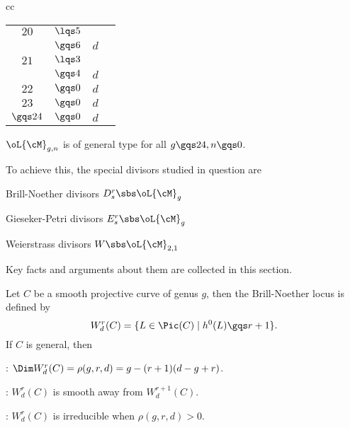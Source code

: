 \documentclass[article, a4paper, twoside]{universal}
\begin{document}
\begin{table}[H]
\begin{tabular}{cc}
\begin{tabular}[t]{cccc}
		  	\hline
			$20$& $\lqs5$ & \red{NK} & \\
				& $\gqs6$ & $d$ & \cite{Farkas2009} \\
		  	\hline
		  	$21$& $\lqs3$ & \red{NK} & \\
				& $\gqs4$ & $d$ & \cite{Farkas2009} \\
		  	\hline
			$22$& $\gqs0$ & $d$ & \cite{FJP2020} \\
		  	$23$& $\gqs0$ & $d$ & \cite{FJP2020} \\
		  	\hline
		  	$\gqs24$& $\gqs0$ & $d$ & \cite{EH1987Kodaira} \\
		  	\bottomrule
		\end{tabular}
	\end{tabular}
\end{table}



\begin{thm}
	$\oL{\cM}_{g,n}$ is of general type for all $g\gqs24,n\gqs0$.
\end{thm}

\begin{rmk}
	To achieve this, the special divisors studied in question are
	\begin{enr}
		\item Brill-Noether divisors $D_{s}^{r}\sbs\oL{\cM}_{g}$
		\item Gieseker-Petri divisors $E_{s}^{r}\sbs\oL{\cM}_{g}$
		\item Weierstrass divisors $W\sbs\oL{\cM}_{2,1}$
	\end{enr}
	Key facts and arguments about them are collected in this section.
\end{rmk}


\begin{thm}
	Let $C$ be a smooth projective curve of genus $g$, then the Brill-Noether locus is defined by
	\[
		W_{d}^{r}(C)=\{L\in\Pic(C)\mid h^{0}(L)\gqs r+1\}.
	\]
	If $C$ is general, then
	\begin{enr}[label=(\arabic*)]
		\item \cite{GH1980}: $\Dim W_{d}^{r}(C)=\rho(g,r,d)=g-(r+1)(d-g+r)$.
		\item \cite{Gieseker1982Petri}: $W_{d}^{r}(C)$ is smooth away from $W_{d}^{r+1}(C)$.
		\item \cite{FL1981}: $W_{d}^{r}(C)$ is irreducible when $\rho(g,r,d)>0$.
	\end{enr}
\end{thm}
\end{document}
